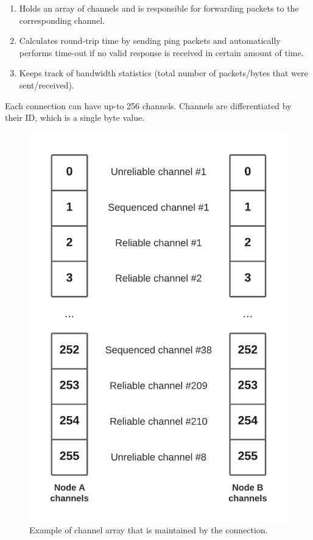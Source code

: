 \documentclass[times, utf8, diplomski]{fer}
\begin{document}
\begin{enumerate}
	\item Holds an array of channels and is responsible for forwarding packets to the corresponding channel.
	\item Calculates round-trip time by sending ping packets and automatically performs time-out if no valid response is received in certain amount of time.
	\item Keeps track of bandwidth statistics (total number of packets/bytes that were sent/received).
\end{enumerate}

Each connection can have up-to 256 channels. Channels are differentiated by their ID, which is a single byte value.

\begin{figure}[H]
	\centering
	\includegraphics[scale=0.2]{Connection-channels}
	\caption{Example of channel array that is maintained by the connection.}
\end{figure}
\end{document}
